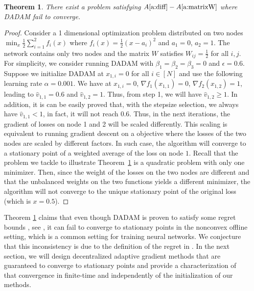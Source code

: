 \documentclass{article} %
\newtheorem{theorem}{Theorem}
\begin{document}
\begin{theorem}\label{thm: dadam_diverge}
	There exist a problem satisfying $A\ref{a:diff} -A\ref{a:matrixW}$ where DADAM fail to converge.   
\end{theorem} 
\begin{proof}
Consider  a 1 dimensional optimization problem distributed on two nodes $\min_{x} \frac{1}{2 }\sum_{i=1} ^2 f_i(x)$ where $ f_i(x) =  \frac{1}{2} (x - a_i)^2$ and $a_1 = 0$, $a_2 = 1$.
The network contains only two nodes and the matrix $W$ satisfies $W_{ij} = \frac{1}{2}$ for all $i,j$. 
For simplicity, we consider running DADAM with $\beta_1 = \beta_2 = \beta_3 = 0$ and $\epsilon = 0.6$.   Suppose we initialize DADAM at $x_{1,i} = 0$ for all $i \in [N]$ and use the following learning rate $\alpha = 0.001$.  
We have at $x_{1,i} = 0$, $\nabla f_1(x_{1,1}) = 0$,  $\nabla f_2(x_{1,2}) = 1$, leading to $\hat v_{1,1} = 0.6$ and $\hat v_{1,2} = 1$. 
Thus, from step 1, we will have $\hat v_{1,2} \geq 1$. 
In addition, it is can be easily proved that, with the stepsize selection, we always have $\hat v_{1,1} < 1 $, in fact, it will not reach $0.6$.
Thus, in the next iterations, the gradient of losses on node 1 and 2 will be scaled  differently.  
This scaling is equivalent to running gradient descent on a objective where the losses of the two nodes are scaled by different factors.  
In such case, the algorithm will converge to a stationary point of a weighted average of the loss on node $1$. 
Recall that the problem we tackle to illustrate Theorem~\ref{thm: dadam_diverge} is a quadratic problem with only one minimizer.
Then, since the weight of the losses on the two nodes are different and that the unbalanced weights on the two functions yields a different minimizer, the algorithm will not converge to the unique stationary point of the original loss (which is $x=0.5$).
\end{proof}

Theorem \ref{thm: dadam_diverge} claims that even though DADAM is proven to satisfy some regret bounds , see \citep{nazari2019dadam}, it can fail to converge to stationary points in the nonconvex offline setting, which is a common setting for training neural networks. 
We conjecture that this inconsistency is due to the definition of the regret in \citep{nazari2019dadam}. 
In the next section, we will design decentralized adaptive gradient methods that are guaranteed to converge to stationary points and provide a characterization of that convergence in finite-time and independently of the initialization of our methods.
\end{document}
